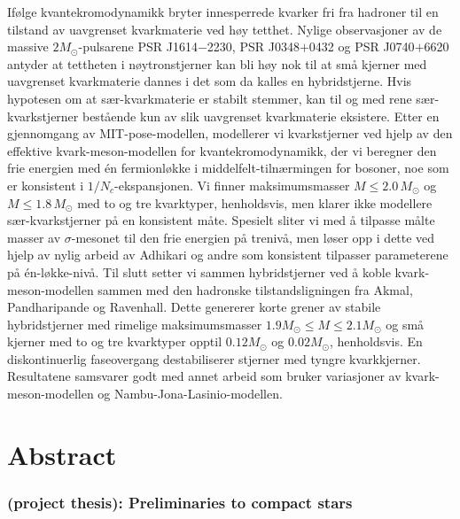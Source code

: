 Ifølge kvantekromodynamikk bryter innesperrede kvarker fri fra hadroner til en tilstand av uavgrenset kvarkmaterie ved høy tetthet.
Nylige observasjoner av de massive $2 M_\odot$-pulsarene PSR J1614$-$2230, PSR J0348$+$0432 og PSR J0740$+$6620
antyder at tettheten i nøytronstjerner kan bli høy nok til at små kjerner med uavgrenset kvarkmaterie
dannes i det som da kalles en hybridstjerne.
Hvis hypotesen om at sær-kvarkmaterie er stabilt stemmer,
kan til og med rene sær-kvarkstjerner bestående kun av slik uavgrenset kvarkmaterie eksistere.
Etter en gjennomgang av MIT-pose-modellen,
modellerer vi kvarkstjerner ved hjelp av den effektive kvark-meson-modellen for kvantekromodynamikk,
der vi beregner den frie energien med én fermionløkke i middelfelt-tilnærmingen for bosoner, %
noe som er konsistent i $1/N_c$-ekspansjonen.
Vi finner maksimumsmasser $M \leq 2.0 \, M_\odot$ og $M \leq 1.8 \, M_\odot$ med
to og tre kvarktyper, henholdsvis,
men klarer ikke modellere sær-kvarkstjerner på en konsistent måte.
Spesielt sliter vi med å tilpasse målte masser av $\sigma$-mesonet til den frie energien på trenivå,
men løser opp i dette ved hjelp av nylig arbeid av Adhikari og andre
som konsistent tilpasser parameterene på én-løkke-nivå.
Til slutt setter vi sammen hybridstjerner ved å koble kvark-meson-modellen
sammen med den hadronske tilstandsligningen fra Akmal, Pandharipande og Ravenhall.
Dette genererer korte grener av stabile hybridstjerner med rimelige maksimumsmasser $1.9 M_\odot \leq M \leq 2.1 M_\odot$
og små kjerner med to og tre kvarktyper opptil $0.12 M_\odot$ og $0.02 M_\odot$, henholdsvis.
En diskontinuerlig faseovergang destabiliserer stjerner med tyngre kvarkkjerner.
Resultatene samsvarer godt med annet arbeid
som bruker variasjoner av kvark-meson-modellen
og Nambu-Jona-Lasinio-modellen.%
\tikzexternaldisable%
%
\tikzexternalenable%

\chapter{Abstract}

\subsection*{ (project thesis): Preliminaries to compact stars}

